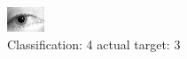 \begin{figure}[h!]
\begin{center}
\includegraphics[width=0.60\columnwidth]{figures/ID1308_class_4_target_3.png}
\end{center}
\caption{ Classification: 4 actual target: 3}
\label{fig:ID1308_class_4_target_3}
\end{figure}
